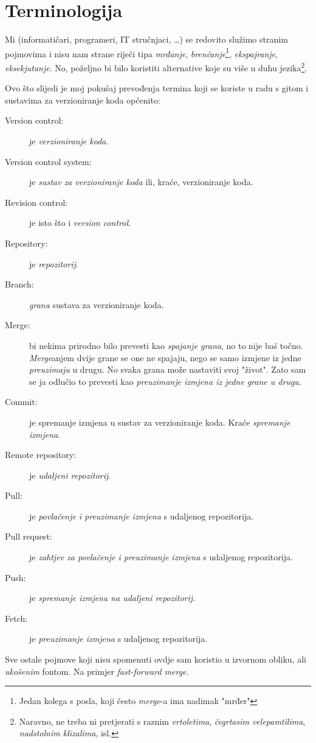 \chapter*{Terminologija}

Mi (informatičari, programeri, IT stručnjaci, \dots) se redovito služimo stranim pojmovima i nisu nam strane riječi tipa \emph{mrđanje}, \emph{brenčanje}\footnote{Jedan kolega s posla, koji često \emph{merge}-a ima nadimak "mrđer"}, \emph{ekspajranje}, \emph{eksekjutanje}.
No, poželjno bi bilo koristiti alternative koje su više u duhu jezika\footnote{Naravno, ne treba ni pretjerati s raznim \emph{vrtoletima}, \emph{čegrtasim velepamtilima}, \emph{nadstolnim klizalima}, isl.}.

Ovo što slijedi je moj pokušaj prevođenja termina koji se koriste u radu s gitom i sustavima za verzioniranje koda općenito: 

\begin{description}
\item[Version control:] je \emph{verzioniranje koda}.
\item[Version control system:] je \emph{sustav za verzioniranje koda} ili, kraće, verzioniranje koda.
\item[Revision control:] je isto što i \emph{version control}.
\item[Repository:] je \emph{repozitorij}.
\item[Branch:] \emph{grana} sustava za verzioniranje koda.
\item[Merge:] bi nekima prirodno bilo prevesti kao \emph{spajanje grana}, no to nije baš točno. \emph{Merge}anjem dvije grane se one ne spajaju, nego se samo izmjene iz jedne \emph{preuzimaju} u drugu. No svaka grana može nastaviti svoj "život". Zato sam se ja odlučio to prevesti kao \emph{preuzimanje izmjena iz jedne grane u drugu}.
\item[Commit:] je spremanje izmjena u sustav za verzioniranje koda. Kraće \emph{spremanje izmjena}.
\item[Remote repository:] je \emph{udaljeni repozitorij}.
\item[Pull:] je \emph{povlačenje i preuzimanje izmjena} s udaljenog repozitorija.
\item[Pull request:] je \emph{zahtjev za povlačenje i preuzimanje izmjena} s udaljenog repozitorija.
\item[Push:] je \emph{spremanje izmjena na udaljeni repozitorij}.
\item[Fetch:] je \emph{preuzimanje izmjena} s udaljenog repozitorija.
\end{description}

Sve ostale pojmove koji nisu spomenuti ovdje sam koristio u izvornom obliku, ali \emph{ukošenim} fontom. Na primjer \emph{fast-forward merge}.


